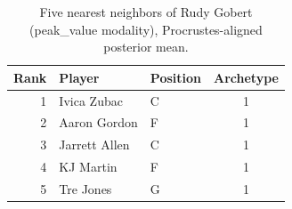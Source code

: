 \begin{table}[htbp]
  \centering\small
  \begin{tabular}{rllc}
    \toprule
    Rank & Player & Position & Archetype \\
    \midrule
    1 & Ivica Zubac & C & 1 \\
    2 & Aaron Gordon & F & 1 \\
    3 & Jarrett Allen & C & 1 \\
    4 & KJ Martin & F & 1 \\
    5 & Tre Jones & G & 1 \\
    \bottomrule
  \end{tabular}
  \caption{Five nearest neighbors of Rudy Gobert (peak_value modality), Procrustes-aligned posterior mean.}
  \label{tab:Rudy_Gobert_neighbors_peak_value}
\end{table}

